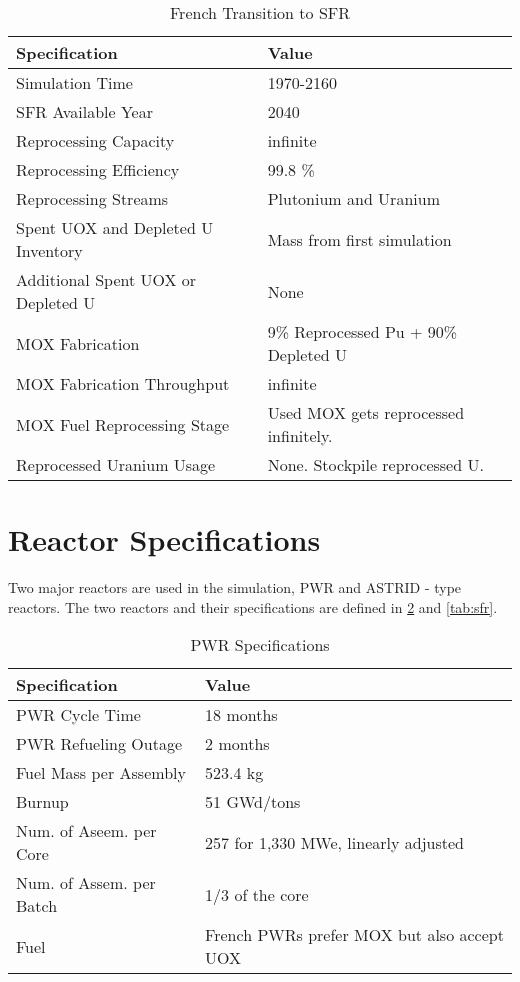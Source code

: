 \begin{table}[h]
	\centering
	\begin{tabularx}{\textwidth}{bb}
		\hline
		Specification & Value \\
		\hline
		Simulation Time & 1970-2160 \\
		\gls{SFR} Available Year & 2040 \\
		Reprocessing Capacity & infinite \\
		Reprocessing Efficiency & 99.8 \% \\
		Reprocessing Streams & Plutonium and Uranium \\
		\small{Spent \gls{UOX} and Depleted U Inventory} & Mass from first simulation \\
		\small{Additional Spent \gls{UOX} or Depleted U} & None  \\
		\gls{MOX} Fabrication &  \small{9\% Reprocessed Pu + 90\% Depleted U}  \\
		\gls{MOX} Fabrication Throughput & infinite \\
		\gls{MOX} Fuel Reprocessing Stage &  Used \gls{MOX} gets reprocessed infinitely. \\
		Reprocessed Uranium Usage &  None. Stockpile reprocessed U. \\
		\hline
	\end{tabularx}
	\caption {French Transition to \gls{SFR}}
	\label{tab:sim_france}
\end{table}


\section{Reactor Specifications}
Two major reactors are used in the simulation, \gls{PWR} and ASTRID - type reactors.
The two reactors and their specifications are defined in \cref{tab:pwr} and \cref{tab:sfr}.

\begin{table}[h]
	\centering
	\begin{tabularx}{\textwidth}{bb}
		\hline
		Specification & Value \\
		\hline
		PWR Cycle Time & 18 months \\ 
		PWR Refueling Outage & 2 months \\
		Fuel Mass per Assembly & 523.4 kg \\
		Burnup & 51 GWd/tons \\
		Num. of Aseem. per Core & 257 for 1,330 MWe, linearly adjusted\\
		Num. of Assem. per Batch & 1/3 of the core \\
		Fuel & \small{French \glspl{PWR} prefer \gls{MOX} but also accept \gls{UOX}}\\
		\hline
	\end{tabularx}
	\caption {\gls{PWR} Specifications}
	\label{tab:pwr}
	\end{table}
	
